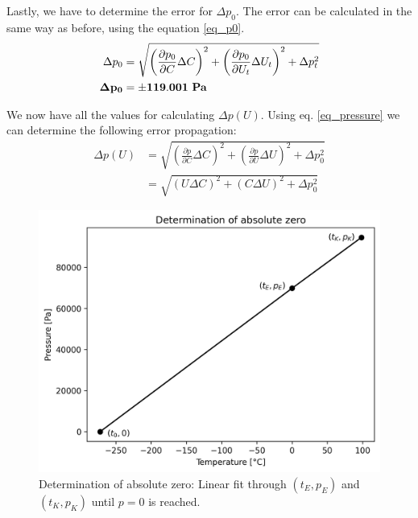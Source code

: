     Lastly, we have to determine the error for $\Delta p_0$. The error can be calculated in the same way as before, using the equation \ref{eq_p0}. %
    \begin{align}
        \Delta p_0 &= \sqrt{ \left(\frac{\partial p_0}{\partial C} \Delta C \right)^2 +
                            \left(\frac{\partial p_0}{\partial U_t} \Delta U_t \right)^2 +
                            \Delta p_t^2}\\
        \bf \Delta p_0 &= \bf \pm 119.001 ~\si{\bf\pascal} \label{dlta_p0}
    \end{align}

    We now have all the values for calculating $\Delta p(U)$. Using eq. \ref{eq_pressure} we can determine the following error propagation: %
    \begin{align}
        \Delta p(U) &= \sqrt{ \left(\frac{\partial p}{\partial C} \Delta C \right)^2 +
                            \left(\frac{\partial p}{\partial U} \Delta U \right)^2 +
                            \Delta p_0^2}\\
        &= \sqrt{ \left( U \Delta C \right)^2 +
                \left( C \Delta U \right)^2 + 
                \Delta p_0^2} \label{eq_dlta_p}
    \end{align}

    \begin{figure}[H]
        \centering
        \includegraphics[]{src/images/absolute_zero.png}
        \caption{Determination of absolute zero: Linear fit through $(t_E, p_E)$ and $(t_K, p_K)$ until $p = 0$ is reached.}
        \label{fig_abs_zero}
    \end{figure}


